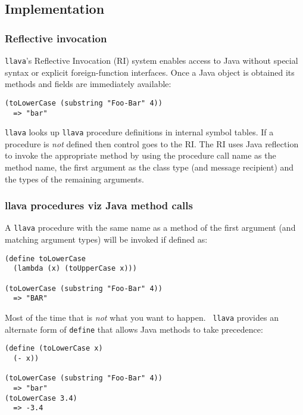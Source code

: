 \documentclass{acm-final/sig-alternate-modified}
\begin{document}
\subsection{Implementation}

\subsubsection{Reflective invocation}

{\tt llava}'s Reflective Invocation (RI) system enables access to Java
without special syntax or explicit foreign-function interfaces.  Once
a Java object is obtained its methods and fields are immediately
available:

\small
\begin{verbatim}
(toLowerCase (substring "Foo-Bar" 4))
  => "bar"
\end{verbatim}
\normalsize

{\tt llava} looks up {\tt llava} procedure definitions in internal
symbol tables.  If a procedure is \emph{not} defined then control goes
to the RI.  The RI uses Java reflection to invoke the appropriate
method by using the procedure call name as the method name, the first
argument as the class type (and message recipient) and the types of
the remaining arguments.

\subsubsection{llava procedures viz Java method calls}

A {\tt llava} procedure with the same name as a method of the first
argument (and matching argument types) will be invoked if defined as:

\small
\begin{verbatim}
(define toLowerCase
  (lambda (x) (toUpperCase x)))

(toLowerCase (substring "Foo-Bar" 4))
  => "BAR"
\end{verbatim}
\normalsize

Most of the time that is \emph{not} what you want to happen.  {\tt
llava} provides an alternate form of {\tt define} that allows Java
methods to take precedence:

\small
\begin{verbatim}
(define (toLowerCase x)
  (- x))

(toLowerCase (substring "Foo-Bar" 4))
  => "bar"
(toLowerCase 3.4)
  => -3.4
\end{verbatim}
\normalsize
\end{document}
